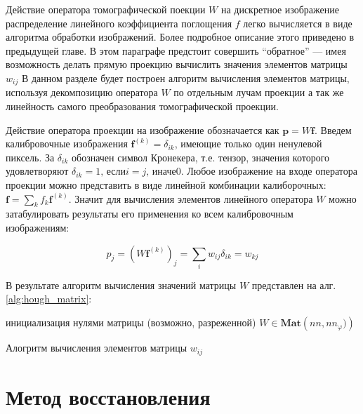 Действие оператора томографической поекции $W$ на дискретное изображение распределение линейного коэффициента поглощения $f$ легко вычисляется в виде алгоритма обработки изображений.
Более подробное описание этого приведено в предыдущей главе.
В этом параграфе  предстоит совершить ``обратное'' --- имея возможность делать прямую проекцию вычислить значения элементов матрицы $w_{ij}$
В данном разделе будет построен алгоритм вычисления элементов матрицы, используя декомпозицию оператора $W$ по отдельным лучам проекции а так же линейность самого преобразования томографической проекции.

Действие оператора проекции на изображение обозначается как $\mathbf{p} = W\mathbf{f}$.
Введем калибровочные изображения $\mathbf{f}^{(k)} = \delta_{ik}$, имеющие только один ненулевой пиксель.
За $\delta_{ik}$ обозначен символ Кронекера, т.е. тензор, значения которого удовлетворяют $\delta_{ik} = 1 \text{, если} i = j \text{, иначе} 0$.
Любое изображение на входе оператора проекции можно представить в виде линейной комбинации калиборочных: $\mathbf{f} = \sum_k f_k \mathbf{f}^{(k)}$.
Значит для вычисления элементов линейного оператора $W$ можно затабулировать результаты его применения ко всем калибровочным изображениям:

\begin{equation}
  \label{eq:w_on_calib_img}
  p_j = \left(W \mathbf{f}^{(k)} \right)_j = \sum_i w_{ij} \delta_{ik} = w_{kj}
\end{equation}

В результате алгоритм вычисления значений матрицы $W$ представлен на алг. \ref{alg:hough_matrix}:

\begin{algorithm}[H]
 инициализация нулями матрицы (возможно, разреженной) $W \in \textbf{Mat}\left(nn, nn_\varphi)\right)$\;
 \caption{Алогритм вычисления элементов матрицы $w_{ij}$}
 \label{alg:hough_matrix}
\end{algorithm}

\section{Метод восстановления}

